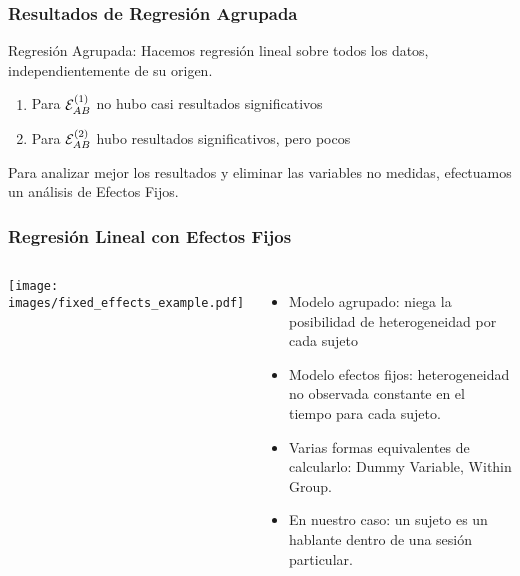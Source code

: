 
\begin{frame}
\frametitle{Resultados de Regresión Agrupada}

  Regresión Agrupada: Hacemos regresión lineal sobre todos los datos, independientemente de su origen.

  \begin{enumerate}
    \item Para $\mathcal{E}_{AB}^{(1)}$ no hubo casi resultados significativos
    \item Para $\mathcal{E}_{AB}^{(2)}$ hubo resultados significativos, pero pocos
  \end{enumerate}

  Para analizar mejor los resultados y eliminar las variables no medidas, efectuamos un análisis de Efectos Fijos.
\end{frame}

\begin{frame}
\frametitle{Regresión Lineal con Efectos Fijos}

  \begin{columns}
    \texttt{[image: images/fixed\_effects\_example.pdf]}
    \begin{itemize}
      \item Modelo agrupado: niega la posibilidad de heterogeneidad por cada sujeto
      \item Modelo efectos fijos: heterogeneidad no observada constante en el tiempo para cada sujeto.
      \item Varias formas equivalentes de calcularlo: Dummy Variable, Within Group.
      \item En nuestro caso: un sujeto es un hablante dentro de una sesión particular.
    \end{itemize}
  \end{columns}


\end{frame}
